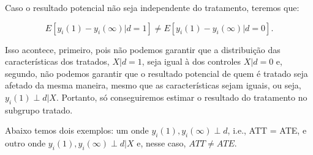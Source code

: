 \documentclass[portugues]{article}
\begin{document}
Caso o resultado potencial não seja independente do tratamento, teremos que:

$$ E[y_i(1) - y_i(\infty)|d=1] \neq E[y_i(1) - y_i(\infty)|d=0]. $$

\noindent Isso acontece, primeiro, pois não podemos garantir que a distribuição das características dos tratados, $X|d=1$, seja igual à dos controles $X|d=0$ e, segundo, não podemos garantir que o resultado potencial de quem é tratado seja afetado da mesma maneira, mesmo que as características sejam iguais, ou seja, $y_i(1) \perp d | X$. Portanto, só conseguiremos estimar o resultado do tratamento no subgrupo tratado.

Abaixo temos dois exemplos: um onde $y_i(1), y_i(\infty) \perp d$, i.e., ATT = ATE, e outro onde $y_i(1), y_i(\infty) \perp d | X$ e, nesse caso, $ATT \neq ATE$.

\vspace{5mm}
\end{document}
